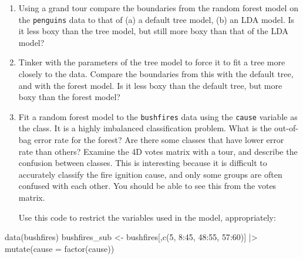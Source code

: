 \documentclass[
  letterpaper,
]{krantz}
\newenvironment{Shaded}{\begin{snugshade}}{\end{snugshade}}
\newcommand{\AttributeTok}[1]{\textcolor[rgb]{0.40,0.45,0.13}{#1}}
\newcommand{\DecValTok}[1]{\textcolor[rgb]{0.68,0.00,0.00}{#1}}
\newcommand{\FunctionTok}[1]{\textcolor[rgb]{0.28,0.35,0.67}{#1}}
\newcommand{\NormalTok}[1]{\textcolor[rgb]{0.00,0.23,0.31}{#1}}
\newcommand{\OtherTok}[1]{\textcolor[rgb]{0.00,0.23,0.31}{#1}}
\newcommand{\SpecialCharTok}[1]{\textcolor[rgb]{0.37,0.37,0.37}{#1}}
\begin{document}
\begin{enumerate}
\def\labelenumi{\arabic{enumi}.}
\item
  Using a grand tour compare the boundaries from the random forest model
  on the \texttt{penguins} data to that of (a) a default tree model, (b)
  an LDA model. Is it less boxy than the tree model, but still more boxy
  than that of the LDA model?
\item
  Tinker with the parameters of the tree model to force it to fit a tree
  more closely to the data. Compare the boundaries from this with the
  default tree, and with the forest model. Is it less boxy than the
  default tree, but more boxy than the forest model?
\item
  Fit a random forest model to the \texttt{bushfires} data using the
  \texttt{cause} variable as the class. It is a highly imbalanced
  classification problem. What is the out-of-bag error rate for the
  forest? Are there some classes that have lower error rate than others?
  Examine the 4D votes matrix with a tour, and describe the confusion
  between classes. This is interesting because it is difficult to
  accurately classify the fire ignition cause, and only some groups are
  often confused with each other. You should be able to see this from
  the votes matrix.

  Use this code to restrict the variables used in the model,
  appropriately:
\end{enumerate}

\begin{Shaded}
\begin{Highlighting}[]
\FunctionTok{data}\NormalTok{(bushfires)}
\NormalTok{bushfires\_sub }\OtherTok{\textless{}{-}}\NormalTok{ bushfires[,}\FunctionTok{c}\NormalTok{(}\DecValTok{5}\NormalTok{, }\DecValTok{8}\SpecialCharTok{:}\DecValTok{45}\NormalTok{, }\DecValTok{48}\SpecialCharTok{:}\DecValTok{55}\NormalTok{, }\DecValTok{57}\SpecialCharTok{:}\DecValTok{60}\NormalTok{)] }\SpecialCharTok{|\textgreater{}}
  \FunctionTok{mutate}\NormalTok{(}\AttributeTok{cause =} \FunctionTok{factor}\NormalTok{(cause))}
\end{Highlighting}
\end{Shaded}
\end{document}
